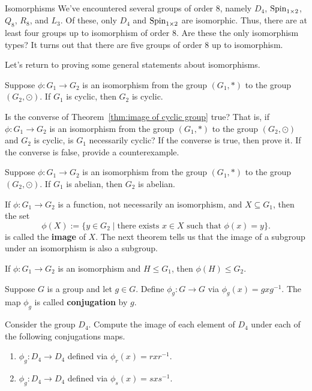 \begin{section}{Isomorphisms}
We've encountered several groups of order 8, namely $D_4$, $\operatorname{Spin}_{1\times 2}$, $Q_8$, $R_8$, and $L_3$.  Of these, only $D_4$ and $\operatorname{Spin}_{1\times 2}$ are isomorphic.  Thus, there are at least four groups up to isomorphism of order 8.  Are these the only isomorphism types?  It turns out that there are five groups of order 8 up to isomorphism.

Let's return to proving some general statements about isomorphisms.

\begin{theorem}\label{thm:image of cyclic group}
Suppose $\phi:G_1\to G_2$ is an isomorphism from the group $(G_1,*)$ to the group $(G_2,\odot)$. If $G_1$ is cyclic, then $G_2$ is cyclic.
\end{theorem}

\begin{problem}
Is the converse of Theorem~\ref{thm:image of cyclic group} true?  That is, if $\phi:G_1\to G_2$ is an isomorphism from the group $(G_1,*)$ to the group $(G_2,\odot)$ and $G_2$ is cyclic, is $G_1$ necessarily cyclic?  If the converse is true, then prove it. If the converse is false, provide a counterexample.
\end{problem}

\begin{theorem}
Suppose $\phi:G_1\to G_2$ is an isomorphism from the group $(G_1,*)$ to the group $(G_2,\odot)$. If $G_1$ is abelian, then $G_2$ is abelian.
\end{theorem}

If $\phi:G_1\to G_2$ is a function, not necessarily an isomorphism, and $X\subseteq G_1$, then the set
\[
\phi(X):=\{y\in G_2\mid \text{there exists } x\in X\text{ such that }\phi(x)=y\}. 
\]
is called the \textbf{image} of $X$.  The next theorem tells us that the image of a subgroup under an isomorphism is also a subgroup.

\begin{theorem}
If $\phi:G_1\to G_2$ is an isomorphism and $H\leq G_1$, then $\phi(H)\leq G_2$.
\end{theorem}

Suppose $G$ is a group and let $g\in G$.  Define $\phi_g:G\to G$ via $\phi_g(x)=gxg^{-1}$.  The map $\phi_g$ is called \textbf{conjugation} by $g$. 

\begin{problem}
Consider the group $D_4$. Compute the image of each element of $D_4$ under each of the following conjugations maps.
\begin{enumerate}[label=\textrm{(\alph*)}]
\item $\phi_g:D_4\to D_4$ defined via $\phi_r(x)=rxr^{-1}$.
\item $\phi_g:D_4\to D_4$ defined via $\phi_s(x)=sxs^{-1}$.
\end{enumerate}
\end{problem}


\end{section}
